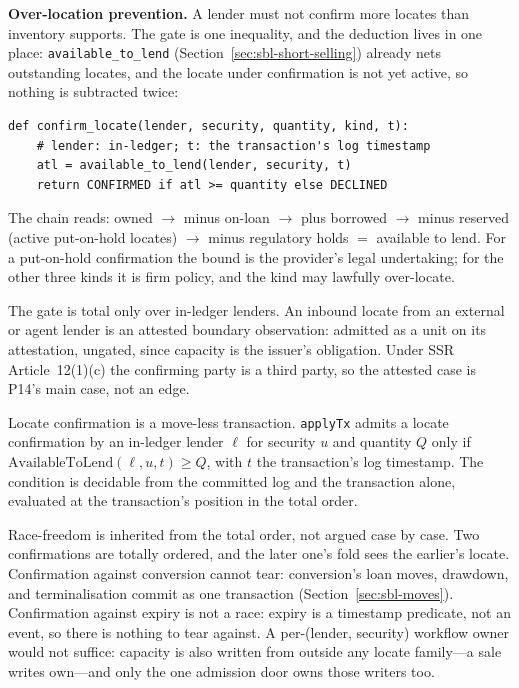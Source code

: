 \noindent\textbf{Over-location prevention.} A lender must not confirm more locates than inventory supports. The gate is one inequality, and the deduction lives in one place: \texttt{available\_to\_lend} (Section~\ref{sec:sbl-short-selling}) already nets outstanding locates, and the locate under confirmation is not yet active, so nothing is subtracted twice:
\begin{lstlisting}
def confirm_locate(lender, security, quantity, kind, t):
    # lender: in-ledger; t: the transaction's log timestamp
    atl = available_to_lend(lender, security, t)
    return CONFIRMED if atl >= quantity else DECLINED
\end{lstlisting}
The chain reads: owned $\to$ minus on-loan $\to$ plus borrowed $\to$ minus reserved (active put-on-hold locates) $\to$ minus regulatory holds $=$ available to lend. For a put-on-hold confirmation the bound is the provider's legal undertaking; for the other three kinds it is firm policy, and the kind may lawfully over-locate.

The gate is total only over in-ledger lenders. An inbound locate from an external or agent lender is an attested boundary observation: admitted as a unit on its attestation, ungated, since capacity is the issuer's obligation. Under SSR Article~12(1)(c) the confirming party is a third party, so the attested case is P14's main case, not an edge.

\begin{principle}
\label{prin:locate-weld}
Locate confirmation is a move-less transaction. \texttt{applyTx} admits a locate confirmation by an in-ledger lender $\ell$ for security $u$ and quantity $Q$ only if $\text{AvailableToLend}(\ell,u,t) \geq Q$, with $t$ the transaction's log timestamp. The condition is decidable from the committed log and the transaction alone, evaluated at the transaction's position in the total order.
\end{principle}

Race-freedom is inherited from the total order, not argued case by case. Two confirmations are totally ordered, and the later one's fold sees the earlier's locate. Confirmation against conversion cannot tear: conversion's loan moves, drawdown, and terminalisation commit as one transaction (Section~\ref{sec:sbl-moves}). Confirmation against expiry is not a race: expiry is a timestamp predicate, not an event, so there is nothing to tear against. A per-(lender, security) workflow owner would not suffice: capacity is also written from outside any locate family---a sale writes $\mathrm{own}$---and only the one admission door owns those writers too.

